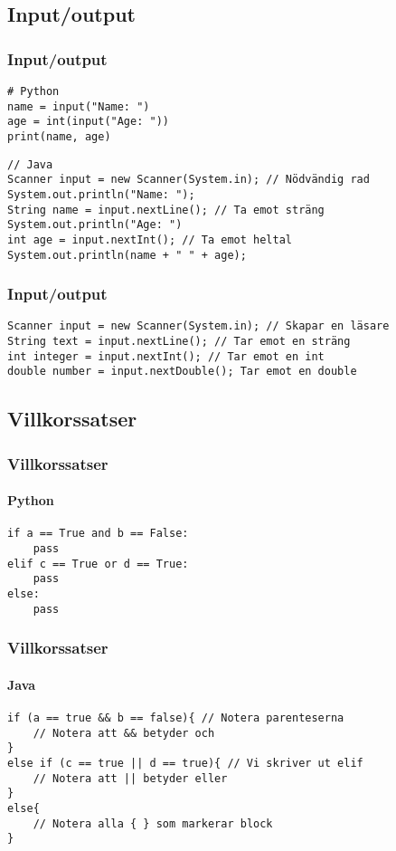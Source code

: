 \documentclass[aspectratio=169]{beamer}
\begin{document}
\subsection{Input/output}

\begin{frame}[fragile]
    \frametitle{Input/output}

    \begin{lstlisting}[style=python]
# Python
name = input("Name: ")
age = int(input("Age: "))
print(name, age)
    \end{lstlisting}

    \begin{lstlisting}[style=java]
// Java
Scanner input = new Scanner(System.in); // Nödvändig rad
System.out.println("Name: ");
String name = input.nextLine(); // Ta emot sträng
System.out.println("Age: ")
int age = input.nextInt(); // Ta emot heltal
System.out.println(name + " " + age);
    \end{lstlisting}

\end{frame}

\begin{frame}[fragile]
    \frametitle{Input/output}

    \begin{lstlisting}[style=java]
Scanner input = new Scanner(System.in); // Skapar en läsare
String text = input.nextLine(); // Tar emot en sträng
int integer = input.nextInt(); // Tar emot en int
double number = input.nextDouble(); Tar emot en double
    \end{lstlisting}

\end{frame}

\subsection{Villkorssatser}

\begin{frame}[fragile]
    \frametitle{Villkorssatser}
    \framesubtitle{Python}

    \begin{lstlisting}[style=python]
if a == True and b == False:
    pass
elif c == True or d == True:
    pass
else:
    pass
    \end{lstlisting}

\end{frame}

\begin{frame}[fragile]
    \frametitle{Villkorssatser}
    \framesubtitle{Java}

    \begin{lstlisting}[style=java]
if (a == true && b == false){ // Notera parenteserna
    // Notera att && betyder och
}
else if (c == true || d == true){ // Vi skriver ut elif
    // Notera att || betyder eller
}
else{
    // Notera alla { } som markerar block
}
    \end{lstlisting}

\end{frame}
\end{document}
